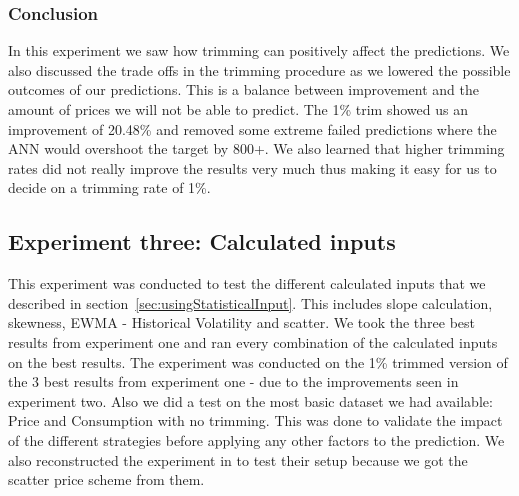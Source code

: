 \begin{table}[H]
\centering  %
\caption{Trims} %
\label{table:Top10Trimming} %
\end{table}



\subsubsection{Conclusion}
In this experiment we saw how trimming can positively affect the predictions. We also discussed the trade offs in the trimming procedure as we lowered the possible outcomes of our predictions. This is a balance between improvement and the amount of prices we will not be able to predict. The 1\% trim showed us an improvement of 20.48\% and removed some extreme failed predictions where the ANN would overshoot the target by 800+. We also learned that higher trimming rates did not really improve the results very much thus making it easy for us to decide on a trimming rate of 1\%.

\newpage
\subsection{Experiment three: Calculated inputs}
\label{sec:priceExperimentThree}
This experiment was conducted to test the different calculated inputs that we described in section~\ref{sec:usingStatisticalInput}. This includes slope calculation, skewness, EWMA - Historical Volatility and scatter. We took the three best results from experiment one and ran every combination of the calculated inputs on the best results. The experiment was conducted on the 1\% trimmed version of the 3 best results from experiment one - due to the improvements seen in experiment two. Also we did a test on the most basic dataset we had available: Price and Consumption with no trimming. This was done to validate the impact of the different strategies before applying any other factors to the prediction. We also reconstructed the experiment in \cite{singhal2011electricity} to test their setup because we got the scatter price scheme from them.

